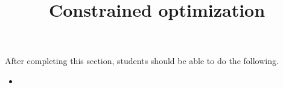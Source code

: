 \documentclass{ximera}
\title{Constrained optimization}
\begin{document}
\begin{abstract}
\end{abstract}

\maketitle

\begin{sectionOutcomes}

After completing this section, students should be able to do the following.

\begin{itemize}
\item 
\end{itemize}

\end{sectionOutcomes}
\end{document}
